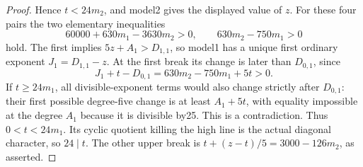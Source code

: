 \begin{proof}
Hence $t<24m_2$, and model2 gives the displayed value of $z$.
For these four pairs the two elementary inequalities
\[
 60000+630m_1-3630m_2>0,\qquad 630m_2-750m_1>0          \tag{B-RD94.13}
\]
hold. The first implies
$5z+A_1>D_{1,1}$, so model1 has a unique first ordinary exponent
$J_1=D_{1,1}-z$. At the first break its change is later than
$D_{0,1}$, since
\[
             J_1+t-D_{0,1}=630m_2-750m_1+5t>0.
\]
If $t\ge24m_1$, all divisible-exponent terms would also change
strictly after $D_{0,1}$: their first possible degree-five change
is at least $A_1+5t$, with equality impossible at the degree
$A_1$ because it is divisible by25. This is a contradiction.
Thus $0<t<24m_1$. Its cyclic quotient killing the high line is the
actual diagonal character, so $24\mid t$. The other upper break
is $t+(z-t)/5=3000-126m_2$, as asserted.
\end{proof}

